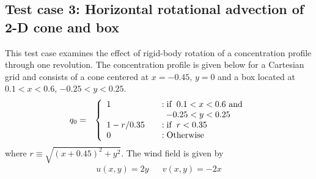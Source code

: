 \subsection{Test case 3: Horizontal rotational advection of 2-D cone and box}
This test case examines the effect of rigid-body rotation of a concentration profile
through one revolution.  The concentration profile is given below for a Cartesian grid
and consists of a cone centered at $x=-0.45$, $y=0$ and a box located at
$0.1<x<0.6$, $-0.25<y<0.25$.
\begin{eqnarray}\label{EqTC3sol}
q_0 &=& \left\{ \begin{array} {l@{\quad \quad}l}
1         &:  \mathrm{if}\,\,\, 0.1 < x < 0.6 \,\,\mathrm{and}\\
          &  \,\,\, -0.25 < y < 0.25 \\
1-r/0.35  &:  \mathrm{if}\,\,\, r < 0.35 \\
0         &: \mathrm{Otherwise}
\end{array}
\right.
\end{eqnarray}
where $r \equiv \sqrt{\left( x+0.45\right)^2+y^2}$.
The wind field is given by
\begin{eqnarray}
u(x,y)=2y & & v(x,y)=-2x \label{EqTC3Wind}
\end{eqnarray}

